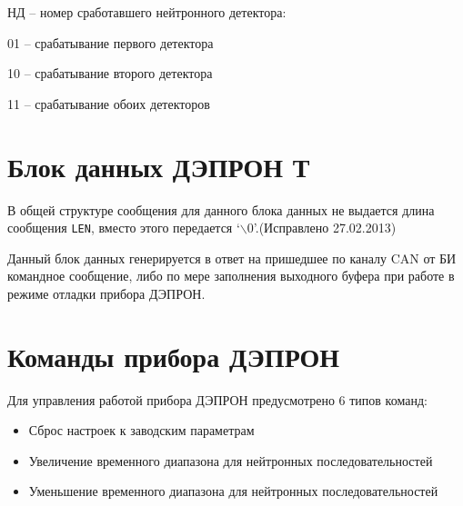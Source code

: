 {\begin{flushleft}
	
\end{flushleft}


\begin{flushleft}
	НД -- номер сработавшего нейтронного детектора:
\end{flushleft}


\begin{flushleft}
	01 -- срабатывание первого детектора
\end{flushleft}


\begin{flushleft}
	10 -- срабатывание второго детектора
\end{flushleft}


\begin{flushleft}
	11 -- срабатывание обоих детекторов
\end{flushleft}




\section{Блок данных ДЭПРОН Т}

В общей структуре сообщения для данного блока данных не выдается длина сообщения \texttt{LEN}, вместо этого передается {`}\ensuremath{\backslash}0'.(Исправлено 27.02.2013)


Данный блок данных генерируется в ответ на пришедшее по каналу CAN от БИ командное сообщение, либо по мере заполнения выходного буфера при работе в режиме отладки прибора ДЭПРОН.



\section{Команды прибора ДЭПРОН}



Для управления работой прибора ДЭПРОН предусмотрено 6 типов команд:

\begin{itemize}
	\item 	Сброс настроек к заводским параметрам

	\item Увеличение временного диапазона для нейтронных последовательностей

	\item Уменьшение временного диапазона для нейтронных последовательностей


\end{itemize}}

